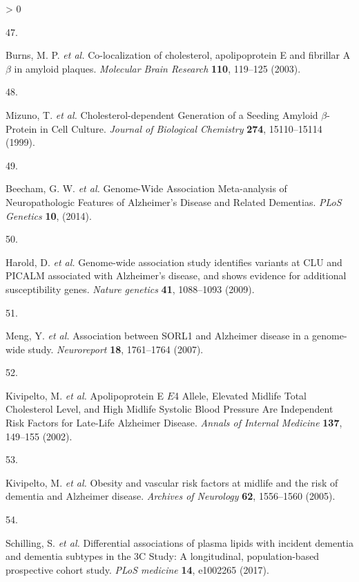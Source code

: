\documentclass[a4paper, twoside]{templates/ociamthesis}
\newlength{\cslhangindent}
\newlength{\csllabelwidth}
\newenvironment{CSLReferences}[3] %
 {%
  \setlength{\parindent}{0pt}
  \ifodd #1 \everypar{\setlength{\hangindent}{\cslhangindent}}\ignorespaces\fi
  \ifnum #2 > 0
  \setlength{\parskip}{#2\baselineskip}
  \fi
 }%
 {}
\newcommand{\CSLLeftMargin}[1]{\parbox[t]{\maxof{\widthof{#1}}{\csllabelwidth}}{#1}}
\newcommand{\CSLRightInline}[1]{\parbox[t]{\linewidth - \csllabelwidth}{#1}}
\begin{document}
\begin{CSLReferences}{0}{0}
\leavevmode\hypertarget{ref-burns2003}{}%
\CSLLeftMargin{47. }
\CSLRightInline{Burns, M. P. \emph{et al.} Co-localization of cholesterol, apolipoprotein {E} and fibrillar {A\(\beta\)} in amyloid plaques. \emph{Molecular Brain Research} \textbf{110}, 119--125 (2003).}

\leavevmode\hypertarget{ref-mizuno1999}{}%
\CSLLeftMargin{48. }
\CSLRightInline{Mizuno, T. \emph{et al.} Cholesterol-dependent {Generation} of a {Seeding Amyloid} {\(\beta\)}-{Protein} in {Cell Culture}. \emph{Journal of Biological Chemistry} \textbf{274}, 15110--15114 (1999).}

\leavevmode\hypertarget{ref-beecham2014}{}%
\CSLLeftMargin{49. }
\CSLRightInline{Beecham, G. W. \emph{et al.} Genome-{Wide Association Meta}-analysis of {Neuropathologic Features} of {Alzheimer}'s {Disease} and {Related Dementias}. \emph{PLoS Genetics} \textbf{10}, (2014).}

\leavevmode\hypertarget{ref-harold2009}{}%
\CSLLeftMargin{50. }
\CSLRightInline{Harold, D. \emph{et al.} Genome-wide association study identifies variants at {CLU} and {PICALM} associated with {Alzheimer}'s disease, and shows evidence for additional susceptibility genes. \emph{Nature genetics} \textbf{41}, 1088--1093 (2009).}

\leavevmode\hypertarget{ref-meng2007}{}%
\CSLLeftMargin{51. }
\CSLRightInline{Meng, Y. \emph{et al.} Association between {SORL1} and {Alzheimer} disease in a genome-wide study. \emph{Neuroreport} \textbf{18}, 1761--1764 (2007).}

\leavevmode\hypertarget{ref-kivipelto2002}{}%
\CSLLeftMargin{52. }
\CSLRightInline{Kivipelto, M. \emph{et al.} Apolipoprotein {E} {\(E\)}4 {Allele}, {Elevated Midlife Total Cholesterol Level}, and {High Midlife Systolic Blood Pressure Are Independent Risk Factors} for {Late}-{Life Alzheimer Disease}. \emph{Annals of Internal Medicine} \textbf{137}, 149--155 (2002).}

\leavevmode\hypertarget{ref-kivipelto2005}{}%
\CSLLeftMargin{53. }
\CSLRightInline{Kivipelto, M. \emph{et al.} Obesity and vascular risk factors at midlife and the risk of dementia and {Alzheimer} disease. \emph{Archives of Neurology} \textbf{62}, 1556--1560 (2005).}

\leavevmode\hypertarget{ref-schilling2017}{}%
\CSLLeftMargin{54. }
\CSLRightInline{Schilling, S. \emph{et al.} Differential associations of plasma lipids with incident dementia and dementia subtypes in the {3C Study}: A longitudinal, population-based prospective cohort study. \emph{PLoS medicine} \textbf{14}, e1002265 (2017).}


\end{CSLReferences}
\end{document}
